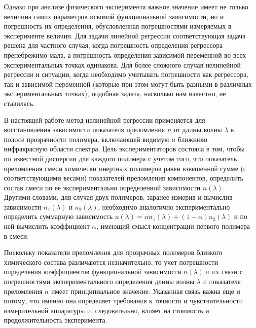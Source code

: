 \documentclass[12pt,a4paper]{article}
\theoremstyle{definition}
\begin{document}
Однако при анализе физического эксперимента важное значение имеет не только величина самих параметров искомой функциональной зависимости, но и погрешность их определения, обусловленная погрешностями измеряемых в эксперименте величин. Для задачи линейной регрессии соответствующая задача решена для частного случая, когда погрешность определения регрессора пренебрежимо мала, а погрешность определения зависимой переменной во всех экспериментальных точках одинакова\cite{Vatunin05}. Для более сложного случая нелинейной регрессии и ситуации, когда необходимо учитывать погрешности как регрессора, так и зависимой переменной (которые при этом могут быть разными в различных экспериментальных точках), подобная задача, насколько нам известно, не ставилась.

В настоящей работе метод нелинейной регрессии применяется для восстановления зависимости показателя преломления $n$ от длины волны $\lambda$ в полосе прозрачности полимера, включающей видимую и ближнюю инфракрасную области спектра. Цель экспериментаторов состояла в том, чтобы по известной дисперсии для каждого полимера с учетом того, что показатель преломления смеси химически инертных полимеров равен взвешенной сумме (с соответствующими весами) показателей преломления компонентов, определить состав смеси по ее экспериментально определенной зависимости $n(\lambda)$. Другими словами, для случая двух полимеров, заранее измерив и вычислив зависимости $n_1(\lambda)$ и $n_2(\lambda)$, необходимо аналогично экспериментально определить суммарную зависимость $n(\lambda) = \alpha n_1(\lambda) + (1 - \alpha) n_2(\lambda)$ и по ней вычислить коэффициент $\alpha$, имеющий смысл концентрации первого полимера в смеси.

Поскольку показатели преломления для прозрачных полимеров близкого химического состава различаются незначительно, то учет погрешности определения коэффициентов функциональной зависимости $n(\lambda)$ и их связи с погрешностями экспериментального определения длины волны $\lambda$ и показателя преломления $n$ имеет принципиальное значение. Указанная связь важна еще и потому, что именно она определяет требования к точности и чувствительности измерительной аппаратуры и, следовательно, влияет на стоимость и продолжительность эксперимента.
\end{document}
